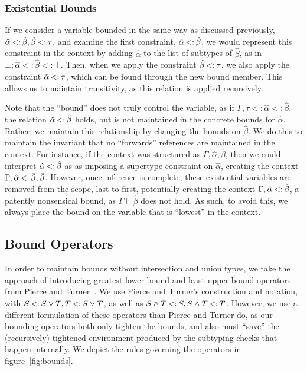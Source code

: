 \documentclass{sig-alternate}
\newcommand{\st}{\ensuremath{\hspace{-1px}<:\hspace{-1px}}}
\newcommand{\betahat}{\hat{\beta}}
\newcommand{\lub}{\ensuremath{\vee}}
\newcommand{\glb}{\ensuremath{\wedge}}
\newcommand{\ctxbsep}{;}
\newcommand{\tst}{{\scriptstyle{<:}}}
\newcommand{\bound}[3]{#1 \tst #2 \tst #3}
\begin{document}
\subsubsection{Existential Bounds}
If we consider a variable bounded in the same way as discussed previously, $\hat{\alpha} \st \hat{\beta}, \hat{\beta} \st \tau$, and examine the first constraint, $\hat{\alpha} \st \hat{\beta}$, we would represent this constraint in the context by adding $\hat{\alpha}$ to the list of subtypes of $\hat{\beta}$, as in $\bound{\bot\ctxbsep \hat{\alpha}}{\hat{\beta}}{\top}$. Then, when we apply the constraint $\hat{\beta} \st \tau$, we also apply the constraint $\hat{\alpha}\st \tau$, which can be found through the new bound member. This allows us to maintain transitivity, as this relation is applied recursively.

Note that the ``bound'' does not truly control the variable, as if $\Gamma, \bound{\tau}{\hat{\alpha}}{ \hat{\beta}}$, the relation $\hat{\alpha} \st \hat{\beta}$ holds, but is not maintained in the concrete bounds for $\hat{\alpha}$. Rather, we maintain this relationship by changing the bounds on $\hat{\beta}$. We do this to maintain the invariant that no ``forwards'' references are maintained in the context. For instance, if the context was structured as $\Gamma,\hat{\alpha},\hat{\beta}$, then we could interpret $\hat{\alpha}\st\hat{\beta}$ as as imposing a supertype constraint on $\hat{\alpha}$, creating the context $\Gamma,\hat{\alpha}\st\hat{\beta},\hat{\beta}$. However, once inference is complete, these existential variables are removed from the scope, last to first, potentially creating the context $\Gamma,\hat{\alpha}\st\hat{\beta}$, a patently nonsensical bound, as $\Gamma \vdash \betahat$ does not hold. As such, to avoid this, we always place the bound on the variable that is ``lowest'' in the context.
 
\subsection{Bound Operators}
In order to maintain bounds without intersection and union types, we take the approach of introducing greatest lower bound and least upper bound operators from Pierce and Turner~\cite{Pierce:2000:LTI:345099.345100}. We use Pierce and Turner's construction and notation, with $S \st S \lub T, T \st S \lub T$, as well as $S \glb T \st S, S \glb T \st T$. However, we use a different formulation of these operators than Pierce and Turner do, as our bounding operators both only tighten the bounds, and also must ``save'' the (recursively) tightened environment produced by the subtyping checks that happen internally. We depict the rules governing the operators in figure~\ref{fig:bounds}.
\end{document}

